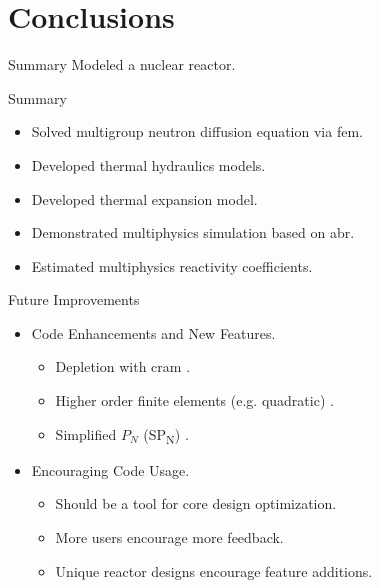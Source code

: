 \section{Conclusions}
\label{sec:conclusions}

\begin{frame}{Summary}
  \huge Modeled a nuclear reactor.
\end{frame}

\begin{frame}{Summary}
  \begin{itemize}
    \item Solved multigroup neutron diffusion equation via \gls{fem}.
    \item Developed thermal hydraulics models.
    \item Developed thermal expansion model.
    \item Demonstrated multiphysics simulation based on \gls{abr}.
    \item Estimated multiphysics reactivity coefficients.
  \end{itemize}
\end{frame}

\begin{frame}{Future Improvements}
  \begin{itemize}
    \item Code Enhancements and New Features.
    \begin{itemize}
      \item Depletion with \gls{cram} \cite{cram}.
      \item Higher order finite elements (e.g. quadratic) \cite{Hosseini2013}.
      \item Simplified $P_N$ (SP\textsubscript{N}) \cite{Ryu2013}. %
    \end{itemize}
    \item Encouraging Code Usage.
    \begin{itemize}
      \item Should be a tool for core design optimization.
      \item More users encourage more feedback.
      \item Unique reactor designs encourage feature additions.
    \end{itemize}
  \end{itemize}
\end{frame}
